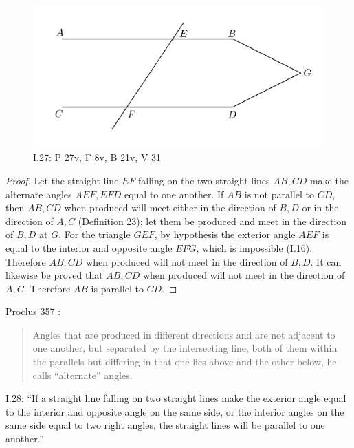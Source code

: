 \documentclass{article}
\begin{document}
\begin{figure}
\begin{center}
\includegraphics{I27.png}
\end{center}
\caption{I.27: P 27v, F 8v, B 21v, V 31}
\label{I27}
\end{figure}

\begin{proof}
Let the straight line $EF$ falling on the two straight lines $AB,CD$ make the alternate angles
$AEF,EFD$ equal to one another. If $AB$ is not parallel to $CD$, then $AB,CD$ when produced will
meet either in the direction of $B,D$ or in the direction of $A,C$ (Definition 23); let them be produced and meet in the direction
of $B,D$ at $G$.
For the triangle $GEF$, by hypothesis the exterior angle $AEF$ is equal to the interior and opposite angle
$EFG$, which is impossible (I.16).
Therefore $AB,CD$ when produced will not meet in the direction of $B,D$. It can likewise be proved
that $AB,CD$ when produced will not meet in the direction of $A,C$.
Therefore $AB$ is parallel to $CD$.
\end{proof}

Proclus 357 \cite[p.~278]{proclus}:

\begin{quote}
Angles that are produced in different directions and are not adjacent
to one another, but separated by the intersecting line, both of
them within the parallels but differing in that one lies above
and the other below, he calls ``alternate'' angles.
\end{quote}

I.28: ``If a straight line falling on two straight lines make the
exterior angle equal to the interior and opposite angle on the
same side, or the interior angles on the same side equal to two
right angles, the straight lines will be parallel to one another.''
\end{document}
